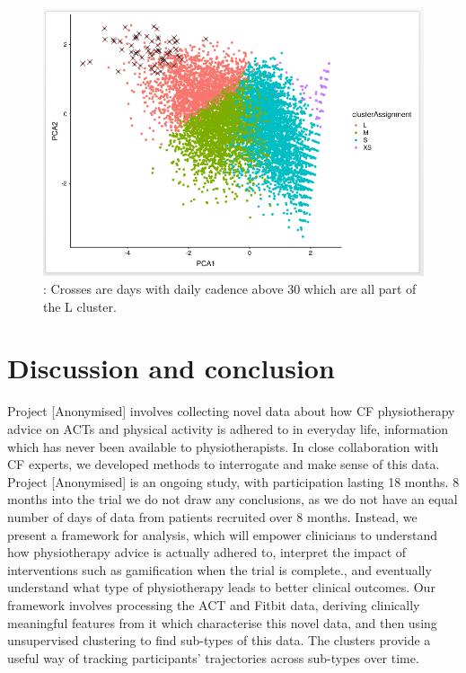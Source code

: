 \documentclass{article}
\begin{document}
\begin{figure}[!htb]
  \centering
  \includegraphics[]{FitbitClusterValidation.png}
  \caption{: Crosses are days with daily cadence above 30 which are all part of the L cluster.}
  \label{fig:FitbitClusterValidation}
\end{figure}


\section{Discussion and conclusion} 

Project [Anonymised] involves collecting novel data about how CF physiotherapy advice on ACTs and physical activity is adhered to in everyday life, information which has never been available to physiotherapists. In close collaboration with CF experts, we developed methods to interrogate and make sense of this data. Project [Anonymised] is an ongoing study, with participation lasting 18 months. 8 months into the trial we do not draw any conclusions, as we do not have an equal number of days of data from patients recruited over 8 months. Instead, we present a framework for analysis, which will empower clinicians to understand how physiotherapy advice is actually adhered to, interpret the impact of interventions such as gamification when the trial is complete., and eventually understand what type of physiotherapy leads to better clinical outcomes. Our framework involves processing the ACT and Fitbit data, deriving clinically meaningful features from it which characterise this novel data, and then using unsupervised clustering to find sub-types of this data. The clusters provide a useful way of tracking participants' trajectories across sub-types over time. 
\end{document}

